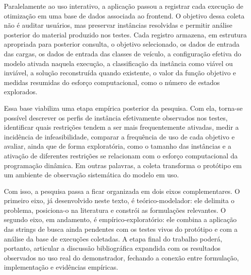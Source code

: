Paralelamente ao uso interativo, a aplicação passou a registrar cada execução
de otimização em uma base de dados associada ao frontend. O objetivo dessa
coleta não é auditar usuários, mas preservar instâncias resolvidas e permitir
análise posterior do material produzido nos testes. Cada registro armazena, em
estrutura apropriada para posterior consulta, o objetivo selecionado, os dados
de entrada das cargas, os dados de entrada das classes de veículo, a
configuração efetiva do modelo ativada naquela execução, a classificação da
instância como viável ou inviável, a solução reconstruída quando existente, o
valor da função objetivo e medidas resumidas do esforço computacional, como o
número de estados explorados.

Essa base viabiliza uma etapa empírica posterior da pesquisa. Com ela, torna-se
possível descrever os perfis de instância efetivamente observados nos testes,
identificar quais restrições tendem a ser mais frequentemente ativadas, medir a
incidência de infeasibilidade, comparar a frequência de uso de cada objetivo e
avaliar, ainda que de forma exploratória, como o tamanho das instâncias e a
ativação de diferentes restrições se relacionam com o esforço computacional da
programação dinâmica. Em outras palavras, a coleta transforma o protótipo em
um ambiente de observação sistemática do modelo em uso.

Com isso, a pesquisa passa a ficar organizada em dois eixos complementares. O
primeiro eixo, já desenvolvido neste texto, é teórico-modelador: ele delimita o
problema, posiciona-o na literatura e constrói as formulações relevantes. O
segundo eixo, em andamento, é empírico-exploratório: ele combina a aplicação
das strings de busca ainda pendentes com os testes vivos do protótipo e com a
análise da base de execuções coletadas. A etapa final do trabalho poderá,
portanto, articular a discussão bibliográfica expandida com os resultados
observados no uso real do demonstrador, fechando a conexão entre formulação,
implementação e evidências empíricas.
